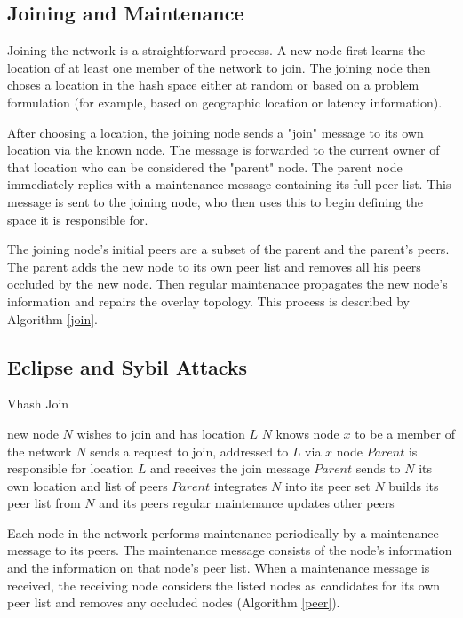 \documentclass{IEEEtran}
\begin{document}
\subsection{Joining and Maintenance}
Joining the network is a straightforward process. A new node first learns the location of at least one member of the network to join. The joining node then choses a location in the hash space either at random or based on a problem formulation (for example, based on geographic location or latency information).

After choosing a location, the joining node sends a "join" message to its own location via the known node.
The message is forwarded to the current owner of that location who can be considered the "parent" node.
The parent node immediately replies with a maintenance message containing its full peer list. This message is sent to the joining node, who then uses this to begin defining the space it is responsible for. 

The joining node's initial peers are a subset of the parent and the parent's peers. The parent adds the new node to its own peer list and removes all his peers occluded by the new node.  Then regular maintenance propagates the new node's information and repairs the overlay topology.  This process is described by Algorithm \ref{join}.



\subsection{Eclipse and Sybil Attacks}

\begin{algorithm}
\caption{Vhash Join}
\label{join}
\begin{algorithmic}[1]  %
\STATE new node $N$ wishes to join and has location $L$
\STATE $N$ knows node $x$ to be a member of the network
\STATE $N$ sends a request to join, addressed to $L$ via $x$
\STATE node $Parent$ is responsible for location $L$ and receives the join message
\STATE $Parent$ sends to $N$ its own location and list of peers
\STATE $Parent$ integrates $N$ into its peer set
\STATE $N$ builds its peer list from $N$ and its peers
\STATE regular maintenance updates other peers
\end{algorithmic}
\end{algorithm}


Each node in the network performs maintenance periodically by a maintenance message to its peers. The maintenance message consists of the node's information and the information on that node's peer list. When a maintenance message is received, the receiving node considers the listed nodes as candidates for its own peer list and removes any occluded nodes (Algorithm \ref{peer}). 
\end{document}
